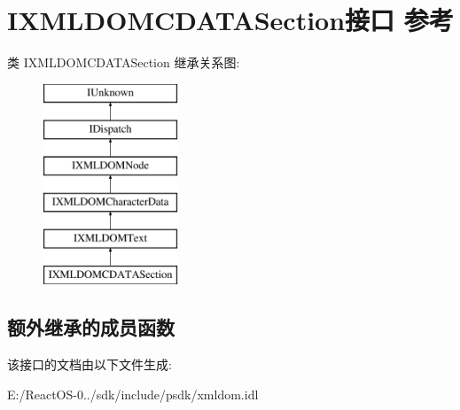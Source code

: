 \hypertarget{interface_i_x_m_l_d_o_m_c_d_a_t_a_section}{}\section{I\+X\+M\+L\+D\+O\+M\+C\+D\+A\+T\+A\+Section接口 参考}
\label{interface_i_x_m_l_d_o_m_c_d_a_t_a_section}
类 I\+X\+M\+L\+D\+O\+M\+C\+D\+A\+T\+A\+Section 继承关系图\+:\begin{figure}[H]
\begin{center}
\leavevmode
\includegraphics[height=6.000000cm]{interface_i_x_m_l_d_o_m_c_d_a_t_a_section}
\end{center}
\end{figure}
\subsection*{额外继承的成员函数}


该接口的文档由以下文件生成\+:\begin{DoxyCompactItemize}
\item 
E\+:/\+React\+O\+S-\/0../sdk/include/psdk/xmldom.\+idl\end{DoxyCompactItemize}
